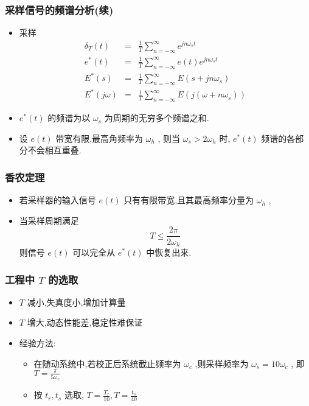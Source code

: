 \documentclass[table]{article}
\begin{document}
\begin{frame}
\frametitle{采样信号的频谱分析(续)}
\label{sec-2-1-4}

\begin{itemize}
\item 采样
       \begin{eqnarray*}
       \delta_T(t) &=& \frac{1}{T}\sum_{n=-\infty}^{\infty}e^{jn\omega_s t} \\
       e^*(t) &=& \frac{1}{T}\sum_{n=-\infty}^{\infty}e(t)e^{jn\omega_s t} \\
       E^*(s) &=& \frac{1}{T}\sum_{n=-\infty}^{\infty}E(s+jn\omega_s ) \\
       E^*(j\omega) &=& \frac{1}{T}\sum_{n=-\infty}^{\infty}E(j(\omega+n\omega_s)) 
       \end{eqnarray*}
\item <2->$e^*(t)$  的频谱为以  $\omega_s$  为周期的无穷多个频谱之和.
\item <3->设  $e(t)$ 带宽有限,最高角频率为  $\omega_h$ , 则当  $\omega_s>2\omega_h$  时,  $e^*(t)$  频谱的各部分不会相互重叠.
\end{itemize}
\end{frame}
\begin{frame}
\frametitle{香农定理}
\label{sec-2-1-5}

\begin{itemize}
\item <2->若采样器的输入信号  $e(t)$ 只有有限带宽,且其最高频率分量为  $\omega_h$  ,
\item <3->当采样周期满足  
	 \[T\leq\frac{2\pi}{2\omega_h}\]  
     则信号  $e(t)$  可以完全从  $e^*(t)$  中恢复出来.
\end{itemize}
\end{frame}
\begin{frame}
\frametitle{工程中  $T$  的选取}
\label{sec-2-1-6}

\begin{itemize}
\item <2->$T$  减小,失真度小,增加计算量
\item <3->$T$  增大,动态性能差,稳定性难保证
\item <4->经验方法:
\begin{itemize}
\item <4->在随动系统中,若校正后系统截止频率为  $\omega_c$ ,则采样频率为  $\omega_s=10\omega_c$  , 即  $T=\frac{\pi}{5\omega_c}$
\item <5->按  $t_r,t_s$  选取,   $T=\frac{T_r}{10},T=\frac{t_s}{40}$
\end{itemize}
\end{itemize}
\end{frame}
\end{document}
